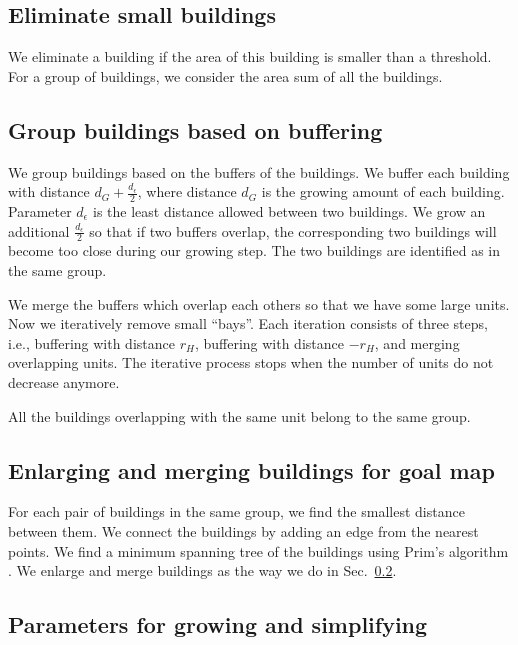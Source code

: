 \documentclass[graybox]{svmult}
\newcommand{\sect}{Sec.~}
\begin{document}
\subsection{Eliminate small buildings}
\label{sec:Eliminate}
We eliminate a building if the area of this building is smaller than a 
threshold.
For a group of buildings, we consider the area sum of all the buildings.


\subsection{Group buildings based on buffering}
\label{sec:Grouping}
We group buildings based on the buffers of the buildings. 
We buffer each building with distance $d_G + \frac{d_\epsilon}{2}$, 
where distance $d_G$ is the growing amount of each building. 
Parameter $d_\epsilon$ is the least distance allowed between two buildings.
We grow an additional $\frac{d_\epsilon}{2}$ so that if two buffers overlap, 
the corresponding two buildings will become too close during our growing step.
The two buildings are identified as in the same group.

We merge the buffers which overlap each others so that we have some large units.
Now we iteratively remove small ``bays''.
Each iteration consists of three steps, i.e., 
buffering with distance $r_H$, buffering with distance $-r_H$, and
merging overlapping units.
The iterative process stops when the number of units do not decrease anymore.

All the buildings overlapping with the same unit belong to the same group.



\subsection{Enlarging and merging buildings for goal map}
For each pair of buildings in the same group, 
we find the smallest distance between them.
We connect the buildings by adding an edge from the nearest points.
We find a minimum spanning tree of the buildings using Prim's algorithm 
\parencite{Prim1957}.
We enlarge and merge buildings as the way we do in \sect\ref{sec:Grouping}.






\subsection{Parameters for growing and simplifying}
\end{document}

